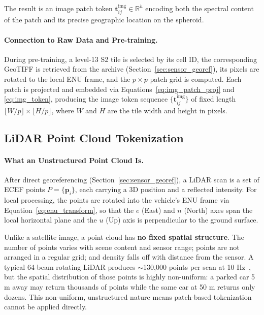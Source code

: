 \documentclass{book}
\begin{document}
The result is an image patch token $\mathbf{t}^{\text{img}}_{ij}
\in \mathbb{R}^h$ encoding both the spectral content of the patch and
its precise geographic location on the spheroid.

\paragraph{Connection to Raw Data and Pre-training.}

During pre-training, a level-13 S2 tile is selected by its cell ID,
the corresponding GeoTIFF is retrieved from the archive
(Section~\ref{sec:sensor_georef}), its pixels are rotated to the
local ENU frame, and the $p \times p$ patch grid is computed.  Each
patch is projected and embedded via
Equations~\eqref{eq:img_patch_proj} and \eqref{eq:img_token},
producing the image token sequence $\{\mathbf{t}^{\text{img}}_{ij}\}$
of fixed length $\lfloor W/p \rfloor \times \lfloor H/p \rfloor$,
where $W$ and $H$ are the tile width and height in pixels.

\subsection{LiDAR Point Cloud Tokenization}
\label{sec:pillars}

\paragraph{What an Unstructured Point Cloud Is.}

After direct georeferencing (Section~\ref{sec:sensor_georef}), a
LiDAR scan is a set of ECEF points $P = \{\mathbf{p}_i\}$, each carrying a 3D position and a
reflected intensity.  For local processing, the points are rotated
into the vehicle's ENU frame via Equation~\eqref{eq:enu_transform},
so that the $e$ (East) and $n$ (North) axes span the local horizontal
plane and the $u$ (Up) axis is perpendicular to the ground surface.

Unlike a satellite image, a point cloud has \textbf{no fixed spatial
structure}.  The number of points varies with scene content and sensor
range; points are not arranged in a regular grid; and density falls
off with distance from the sensor.  A typical 64-beam rotating LiDAR
produces $\sim$130,000 points per scan at 10 Hz~\cite{geiger2012kitti},
but the spatial distribution of those points is highly non-uniform:
a parked car 5 m away may return thousands of points while the same
car at 50 m returns only dozens.  This non-uniform, unstructured
nature means patch-based tokenization cannot be applied directly.
\end{document}
